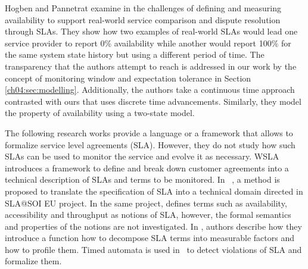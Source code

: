 
Hogben and Pannetrat examine in \cite{hogben2013defavail} the challenges of defining and measuring availability to support real-world service comparison and dispute resolution through SLAs.
They show how two examples of real-world SLAs would lead one service provider to report 0\% availability while another would report 100\% for the same system state history but using a different period of time.
The transparency that the authors attempt to reach is addressed in our work by the concept of monitoring window and expectation tolerance in Section \ref{ch04:sec:modelling}.
Additionally, the authors take a continuous time approach contrasted with ours that uses discrete time advancements.
Similarly, they model the property of availability using a two-state model.

The following research works provide a language or a framework that allows to formalize service level agreements (SLA).
However, they do not study how such SLAs can be used to monitor the service and evolve it as necessary.
WSLA~\cite{keller2003wsla} introduces a framework to define and break down customer agreements into a technical description of SLAs and terms to be monitored.
In ~\cite{mahbub2011translationsla}, a method is proposed to translate the specification of SLA into a technical domain directed in SLA@SOI EU project.
In the same project, \cite{comuzzi2009defavail} defines terms such as availability, accessibility and throughput as notions of SLA, however, the formal semantics and properties of the notions are not investigated.
In \cite{chen2007sladecompose}, authors describe how they introduce a function how to decompose SLA terms into measurable factors and how to profile them.
Timed automata is used in~\cite{raimondi2008fsmsla} to detect violations of SLA and formalize them.

